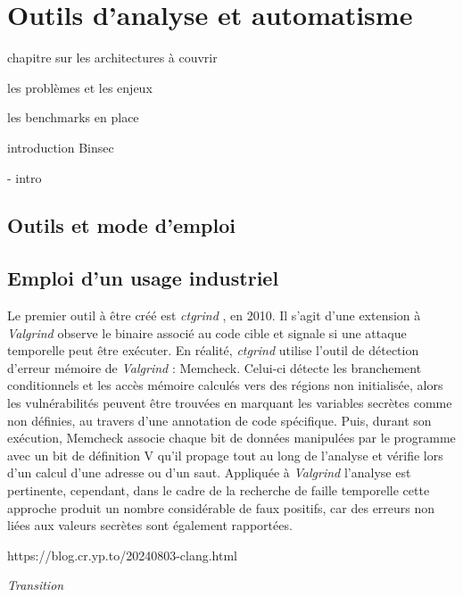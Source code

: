 \chapter{Outils d'analyse et automatisme}
\label{chap:automateVerifAutomatisme}

chapitre sur les architectures à couvrir 

les problèmes et les enjeux

les benchmarks en place

introduction Binsec


- intro


\section{Outils et mode d'emploi}


\section{Emploi d'un usage industriel}

Le premier outil à être créé est \textit{ctgrind} \cite{ctgrind}, en 2010. Il s'agit d'une extension à \textit{Valgrind} observe le binaire associé au code cible et signale si une attaque temporelle peut être exécuter. En réalité, \textit{ctgrind} utilise l'outil de détection d'erreur mémoire de \textit{Valgrind} : Memcheck. Celui-ci détecte les branchement conditionnels et les accès mémoire calculés vers des régions non initialisée, alors les vulnérabilités peuvent être trouvées en marquant les variables secrètes comme non définies, au travers d'une annotation de code spécifique. Puis, durant son exécution, Memcheck associe chaque bit de données manipulées par le programme avec un bit de définition V qu'il propage tout au long de l'analyse et vérifie lors d'un calcul d'une adresse ou d'un saut. Appliquée à \textit{Valgrind} l'analyse est pertinente, cependant, dans le cadre de la recherche de faille temporelle cette approche produit un nombre considérable de faux positifs, car des erreurs non liées aux valeurs secrètes sont également rapportées.\medbreak




https://blog.cr.yp.to/20240803-clang.html






\vfill
\textit{Transition}